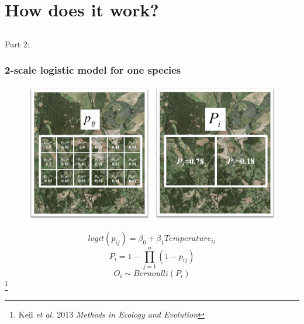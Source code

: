 \documentclass[xcolor=x11names, compress]{beamer}
\renewcommand{\(}{\begin{columns}}
\renewcommand{\)}{\end{columns}}
\newcommand{\<}[1]{\begin{column}{#1}}
\renewcommand{\>}{\end{column}}
\begin{document}
\section{How does it work?}
\subsection{}
\begin{frame}
	\Large{Part 2: \insertsection}
\end{frame}

\begin{frame}
\frametitle{2-scale logistic model for one species}
\begin{figure}
	\includegraphics[width=0.7\linewidth]{fig/scalingp2.png}
\end{figure}
\footnotesize{
{
\begin{equation}
logit (p_{ij}) = \beta_0 + \beta_1 Temperature_{ij}
\end{equation}
}
{
\begin{equation}
P_i=1- \prod_{j=1}^n{(1-p_{ij})} 
\end{equation}
}
{
\begin{equation}
O_{i} \sim Bernoulli(P_i) 
\end{equation}
}
}
\let\thefootnote\relax\footnote{Keil \textit{et al.} 2013 \textit{Methods in Ecology and Evolution}}

\end{frame}
\end{document}
